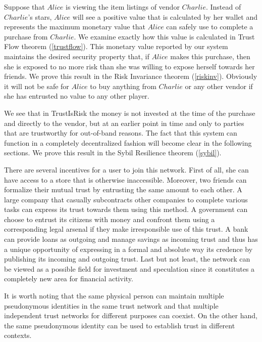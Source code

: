    Suppose that $Alice$ is viewing the item listings of vendor $Charlie$. Instead of $Charlie$'s stars, $Alice$ will see a
   positive value that is calculated by her wallet and represents the maximum monetary value that $Alice$ can safely use to
   complete a purchase from $Charlie$. We examine exactly how this value is calculated in Trust Flow theorem
   (\ref{trustflow}). This monetary value reported by our system maintains the desired security property that, if $Alice$
   makes this purchase, then she is exposed to no more risk than she was willing to expose herself towards her friends.
   We prove this result in the Risk Invariance theorem (\ref{riskinv}). Obviously it will not be safe for $Alice$ to buy
   anything from $Charlie$ or any other vendor if she has entrusted no value to any other player.

   We see that in TrustIsRisk the money is not invested at the time of the purchase and directly to the vendor, but at an
   earlier point in time and only to parties that are trustworthy for out-of-band reasons. The fact that this system can
   function in a completely decentralized fashion will become clear in the following sections. We prove this result in the
   Sybil Resilience theorem (\ref{sybil}).

   There are several incentives for a user to join this network. First of all, she can have access to a store that is
   otherwise inaccessible. Moreover, two friends can formalize their mutual trust by entrusting the same amount to each
   other. A large company that casually subcontracts other companies to complete various tasks can express its trust
   towards them using this method. A government can choose to entrust its citizens with money and confront them using a
   corresponding legal arsenal if they make irresponsible use of this trust. A bank can provide loans as outgoing and
   manage savings as incoming trust and thus has a unique opportunity of expressing in a formal and absolute way its
   credence by publishing its incoming and outgoing trust. Last but not least, the network can be viewed as a possible
   field for investment and speculation since it constitutes a completely new area for financial activity.

   It is worth noting that the same physical person can maintain multiple pseudonymous identities in the same trust network
   and that multiple independent trust networks for different purposes can coexist. On the other hand, the same
   pseudonymous identity can be used to establish trust in different contexts.
